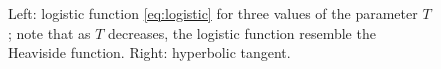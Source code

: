 \documentclass[12pt, a4paper, twoside, openright]{report}
\numberwithin{equation}{chapter}
\theoremstyle{theorem}
\theoremstyle{definition}
\theoremstyle{remark}
\theoremstyle{proposition}
\numberwithin{figure}{chapter}
\begin{document}
\begin{figure}[t]
			
			\caption{Left: logistic function \eqref{eq:logistic} for three values of the parameter $T$; note that as $T$ decreases, the logistic function resemble the Heaviside function. Right: hyperbolic tangent.}
			\label{fig:activation-functions}
		\end{figure}
		
		\vspace*{0.3cm}
		
\end{document}
